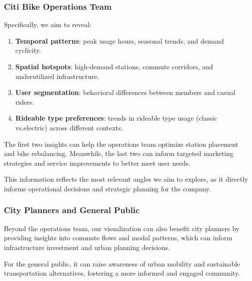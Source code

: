 \subsubsection{Citi Bike Operations Team}
Specifically, we aim to reveal:
\begin{enumerate}
  \item \textbf{Temporal patterns}: peak usage hours, seasonal trends, and demand cyclicity.
  \item \textbf{Spatial hotspots}: high-demand stations, commute corridors, and underutilized infrastructure.
  \item \textbf{User segmentation}: behavioral differences between members and casual riders.
  \item \textbf{Rideable type preferences}: trends in rideable type usage (classic vs.\@ electric) across different contexts.
\end{enumerate}
The first two insights can help the operations team optimize station placement and bike rebalancing.
Meanwhile, the last two can inform targeted marketing strategies and service improvements to better meet user needs.

This information reflects the most relevant angles we aim to explore, as it directly informs operational decisions and strategic planning for the company.

\subsubsection{City Planners and General Public}
Beyond the operations team, our visualization can also benefit city planners by providing insights into commute 
flows and modal patterns, which can inform infrastructure investment and urban planning decisions.

For the general public, it can raise awareness of urban mobility and sustainable transportation alternatives, 
fostering a more informed and engaged community.
